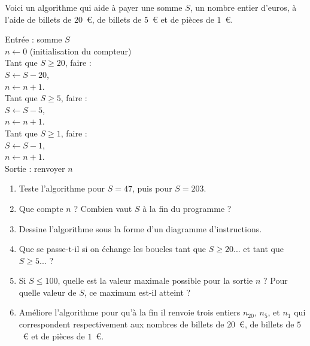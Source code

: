 \documentclass[class=report,crop=false, 12pt]{standalone}
\begin{document}
\begin{activite}
Voici un algorithme qui aide à payer une somme $S$, un nombre entier d'euros, à l'aide de billets de $20$~€, de billets de $5$~€ et de pièces de $1$~€.


\begin{center}
\begin{minipage}{0.6\textwidth}
Entrée : somme $S$ \\
$n \leftarrow 0$ (initialisation du compteur) \\
Tant que $S \ge 20$, faire :\\
\indentation $S \leftarrow S - 20$, \\
\indentation $n \leftarrow n + 1$. \\
Tant que $S \ge 5$, faire :\\
\indentation $S \leftarrow S - 5$, \\
\indentation $n \leftarrow n + 1$. \\
Tant que $S \ge 1$, faire :\\
\indentation $S \leftarrow S - 1$, \\
\indentation $n \leftarrow n + 1$. \\
Sortie : renvoyer $n$
\end{minipage}
\end{center}

\begin{enumerate}
  \item Teste l'algorithme pour $S = 47$, puis pour $S = 203$.
  
  \item Que compte $n$ ? Combien vaut $S$ à la fin du programme ?
  
  \item Dessine l'algorithme sous la forme d'un diagramme d'instructions.

  \item Que se passe-t-il si on échange les boucles \og tant que $S \ge 20$... \fg{} et \og tant que $S \ge 5$... \fg{} ?
  
  \item Si $S \le 100$, quelle est la valeur maximale possible pour la sortie $n$ ? Pour quelle valeur de $S$, ce maximum est-il atteint ?
  
  \item Améliore l'algorithme pour qu'à la fin il renvoie trois entiers $n_{20}$, $n_5$, et $n_1$ qui correspondent respectivement aux nombres de billets de $20$~€, de billets de $5$~€ et de pièces de $1$~€. 
  
\end{enumerate}
\end{activite}
\end{document}
